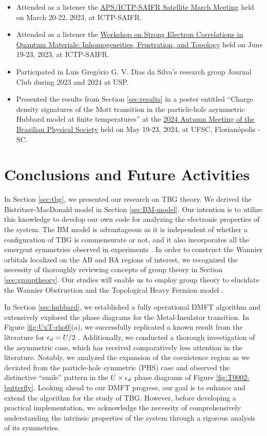 \documentclass[12pt]{report}
\begin{document}
\begin{itemize}
\item Attended as a listener the \href{https://www.ictp-saifr.org/apsmarch23/}{APS/ICTP-SAIFR Satellite March Meeting} held on March 20-22, 2023, at ICTP-SAIFR.
\item Attended as a listener the \href{https://www.ictp-saifr.org/qm2023/}{Workshop on Strong Electron Correlations in Quantum Materials: Inhomogeneities, Frustration, and Topology} held on June 19-23, 2023, at ICTP-SAIFR.
\item Participated in Luis Gregório G. V. Dias da Silva's research group Journal Club during 2023 and 2024 at USP.
\item Presented the results from Section \ref{sec:results} in a poster entitled ``Charge density signatures of the Mott transition in the particle-hole asymmetric Hubbard model at finite temperatures'' at the \href{https://www1.fisica.org.br/~eosbf/2024/index.php/en/}{2024 Autumn Meeting of the Brazilian Physical Society} held on May 19-23, 2024, at UFSC, Florianópolis - SC.
\end{itemize}


\chapter{Conclusions and Future Activities} \label{chp:conclusions}

In Section \ref{sec:tbg}, we presented our research on TBG theory. We derived the Bistritzer-MacDonald model \cite{macdonald2011} in Section \ref{sec:BM-model}. Our intention is to utilize this knowledge to develop our own code for analyzing the electronic properties of the system. The BM model is advantageous as it is independent of whether a configuration of TBG is commensurate or not, and it also incorporates all the emergent symmetries observed in experiments \cite{zou2018}. In order to construct the Wannier orbitals localized on the AB and BA regions of interest, we recognized the necessity of thoroughly reviewing concepts of group theory in Section \ref{sec:grouptheory}. Our studies will enable us to employ group theory to elucidate the Wannier Obstruction \cite{zou2018} and the Topological Heavy Fermion model \cite{topoheavyfermion2022}.

In Section \ref{sec:hubbard}, we established a fully operational DMFT algorithm and extensively explored the phase diagrams for the Metal-Insulator transition. In Figure \ref{fig:UxT-rho0}(a), we successfully replicated a known result from the literature for $\epsilon_d = U/2$ \cite{georges1996}. Additionally, we conducted a thorough investigation of the asymmetric case, which has received comparatively less attention in the literature. Notably, we analyzed the expansion of the coexistence region as we deviated from the particle-hole symmetric (PHS) case and observed the distinctive ``smile'' pattern in the $U \times \epsilon_d$ phase diagrams of Figure \ref{fig:T0002-butterfly}. Looking ahead to our DMFT progress, our goal is to enhance and extend the algorithm for the study of TBG. However, before developing a practical implementation, we acknowledge the necessity of comprehensively understanding the intrinsic properties of the system through a rigorous analysis of its symmetries.

%




\end{document}
